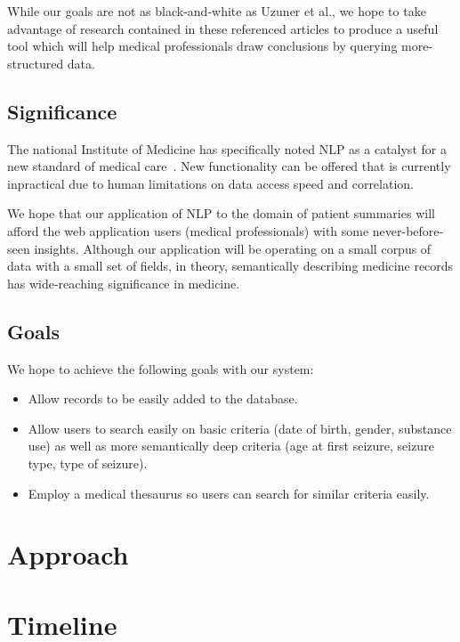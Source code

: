 \documentclass[12pt]{article}
\begin{document}
While our goals are not as black-and-white as Uzuner et al., we hope to take advantage of
research contained in these referenced articles to produce a useful tool which will
help medical professionals draw conclusions by querying more-structured data.

\subsection{Significance}
The national Institute of Medicine has specifically noted NLP as a catalyst for a new
standard of medical care~\cite{friedman}. New functionality can be offered that is currently
inpractical due to human limitations on data access speed and correlation.

We hope that our application of NLP to the domain of patient summaries will afford the
web application users (medical professionals) with some never-before-seen insights.
Although our application will be operating on a small corpus of data with a small set 
of fields, in theory, semantically describing medicine records has wide-reaching 
significance in medicine.

\subsection{Goals}
We hope to achieve the following goals with our system:
\begin{itemize}
	\item Allow records to be easily added to the database.
	\item Allow users to search easily on basic criteria (date of birth, gender,
substance use) as well as more semantically deep criteria (age at first seizure,
seizure type, type of seizure).
	\item Employ a medical thesaurus so users can search for similar criteria easily.
\end{itemize}

\section{Approach}

\section{Timeline}

{}

\end{document}
